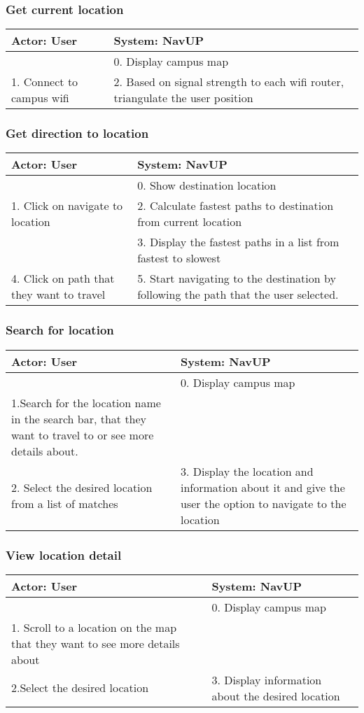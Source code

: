 \documentclass[12pt,a4paper]{article}
\begin{document}
		\subsubsection {Get current location}
		\begin{tabular}{|p{7cm}|p{7cm}|}
			\hline
			\textbf{Actor: User} & \textbf{System: NavUP}\\
			\hline
			 & 0. Display campus map\\
			\hline
			1. Connect to campus wifi & 2.  Based on signal strength to each wifi router, triangulate the user position \\
			\hline
		\end{tabular}
		\subsubsection {Get direction to location}
		\begin{tabular}{|p{7cm}|p{7cm}|}
			\hline
			\textbf{Actor: User} & \textbf{System: NavUP}\\
			\hline
			 & 0. Show destination location\\
			\hline
			1. Click on navigate to location & 2.   Calculate fastest paths to destination from current location  \\
			\hline
			& 3. Display the fastest paths in a list from fastest to slowest \\
			\hline
			4. Click on path that they want to travel &  5. Start navigating to the destination by following the path that the user selected.\\
			\hline
		\end{tabular}
		\subsubsection {Search for location}
		\begin{tabular}{|p{7cm}|p{7cm}|}
			\hline
			\textbf{Actor: User} & \textbf{System: NavUP}\\
			\hline
			 & 0. Display campus map\\
			\hline
			1.Search for the location name in the search bar, that they want to travel to or see more details about. &  \\
			\hline
			2. Select the desired location from a list of matches & 3. Display the location and information about it and give the user the option to navigate to the location \\
			\hline
		\end{tabular}
		\subsubsection {View location detail}
		\begin{tabular}{|p{7cm}|p{7cm}|}
			\hline
			\textbf{Actor: User} & \textbf{System: NavUP}\\
			\hline
			 & 0. Display campus map\\
			\hline
			1. Scroll to a location on the map that they want to see more details about &  \\
			\hline
			2.Select the desired location & 3. Display information about the desired location\\
			\hline
		\end{tabular}
\end{document}
